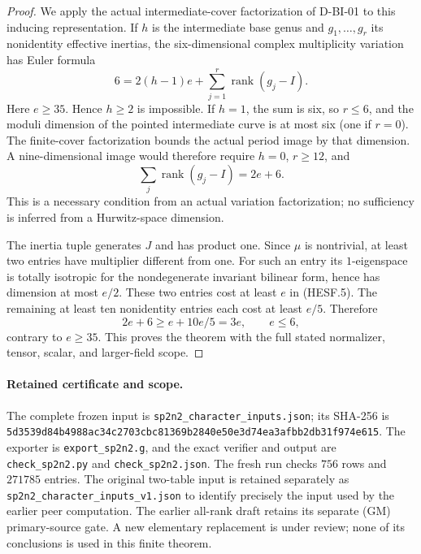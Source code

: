 \begin{proof}
We apply the actual intermediate-cover factorization of D-BI-01 to this
inducing representation. If $h$ is the intermediate base genus and
$g_1,\ldots,g_r$ its nonidentity effective inertias, the six-dimensional
complex multiplicity variation has Euler formula
\[
               6=2(h-1)e+\sum_{j=1}^r\operatorname{rank}(g_j-I).
\tag{HESF.4}
\]
Here $e\ge35$. Hence $h\ge2$ is impossible. If $h=1$, the sum is six,
so $r\le6$, and the moduli dimension of the pointed intermediate curve
is at most six (one if $r=0$). The finite-cover factorization bounds the
actual period image by that dimension. A nine-dimensional image would
therefore require $h=0$, $r\ge12$, and
\[
                   \sum_j\operatorname{rank}(g_j-I)=2e+6.
\tag{HESF.5}
\]
This is a necessary condition from an actual variation factorization;
no sufficiency is inferred from a Hurwitz-space dimension.

The inertia tuple generates $J$ and has product one. Since $\mu$ is
nontrivial, at least two entries have multiplier different from one.
For such an entry its $1$-eigenspace is totally isotropic for the
nondegenerate invariant bilinear form, hence has dimension at most
$e/2$. These two entries cost at least $e$ in (HESF.5). The remaining
at least ten nonidentity entries each cost at least $e/5$. Therefore
\[
                    2e+6\ge e+10e/5=3e,
                    \qquad e\le6,
\tag{HESF.6}
\]
contrary to $e\ge35$. This proves the theorem with the full stated
normalizer, tensor, scalar, and larger-field scope.
\end{proof}

\paragraph{Retained certificate and scope.}
The complete frozen input is \texttt{sp2n2\_character\_inputs.json};
its SHA-256 is \texttt{5d3539d84b4988ac34c2703cbc81369b2840e50e3d74ea3afbb2db31f974e615}.
The exporter is \texttt{export\_sp2n2.g}, and the exact verifier and output
are \texttt{check\_sp2n2.py} and \texttt{check\_sp2n2.json}.
The fresh run checks $756$ rows and $271785$ entries. The original two-table
input is retained separately as \texttt{sp2n2\_character\_inputs\_v1.json}
to identify precisely the input used by the earlier peer computation.
The earlier all-rank draft retains its separate (GM) primary-source gate.
A new elementary replacement is under review; none of its conclusions
is used in this finite theorem.
